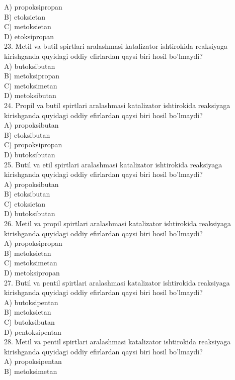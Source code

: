 A) propoksipropan\\
B) etoksietan\\
C) metoksietan\\
D) etoksipropan\\
23. Metil va butil spirtlari aralashmasi katalizator ishtirokida reaksiyaga kirishganda quyidagi oddiy efirlardan qaysi biri hosil bo'lmaydi?\\
A) butoksibutan\\
B) metoksipropan\\
C) metoksimetan\\
D) metoksibutan\\
24. Propil va butil spirtlari aralashmasi katalizator ishtirokida reaksiyaga kirishganda quyidagi oddiy efirlardan qaysi biri hosil bo'lmaydi?\\
A) propoksibutan\\
B) etoksibutan\\
C) propoksipropan\\
D) butoksibutan\\
25. Butil va etil spirtlari aralashmasi katalizator ishtirokida reaksiyaga kirishganda quyidagi oddiy efirlardan qaysi biri hosil bo'lmaydi?\\
A) propoksibutan\\
B) etoksibutan\\
C) etoksietan\\
D) butoksibutan\\
26. Metil va propil spirtlari aralashmasi katalizator ishtirokida reaksiyaga kirishganda quyidagi oddiy efirlardan qaysi biri hosil bo'lmaydi?\\
A) propoksipropan\\
B) metoksietan\\
C) metoksimetan\\
D) metoksipropan\\
27. Butil va pentil spirtlari aralashmasi katalizator ishtirokida reaksiyaga kirishganda quyidagi oddiy efirlardan qaysi biri hosil bo'lmaydi?\\
A) butoksipentan\\
B) metoksietan\\
C) butoksibutan\\
D) pentoksipentan\\
28. Metil va pentil spirtlari aralashmasi katalizator ishtirokida reaksiyaga kirishganda quyidagi oddiy efirlardan qaysi biri hosil bo'lmaydi?\\
A) propoksipentan\\
B) metoksimetan\\
